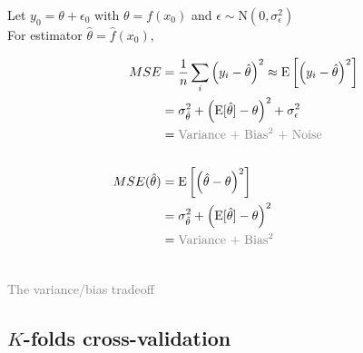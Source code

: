 \documentclass[11pt, oneside]{article}
\begin{document}
\noindent \begin{minipage}{0.55\linewidth} 
Let $y_0 = \theta + \epsilon_0$ with $\theta = f(x_0)$ and $\epsilon \sim \textrm{N}(0,\sigma^2_\epsilon)$\\

For estimator $\hat \theta = \hat f(x_0),$

\begin{align*}
MSE ={}&  \frac{1}{n}\sum_i \left(y_i - \hat \theta \right)^2 \approx 
\textrm{E}\left[\left(y_i - \hat \theta \right)^2\right] \\
={}&
\sigma^2_{\hat \theta} + \left(\textrm{E}{[}\hat \theta{]}-\theta\right)^2 + \sigma^2_\epsilon \\ 
={}& \textcolor{gray}{\textrm{Variance $+$ Bias$^2$ $+$ Noise}} \\ \\
MSE(\hat \theta) ={}& \textrm{E}\left[\left(\hat \theta - \theta\right)^2\right] \\
={}&
\sigma^2_{\hat \theta} + \left(\textrm{E}{[}\hat \theta{]}-\theta\right)^2 \\
={}& \textcolor{gray}{\textrm{Variance $+$ Bias$^2$}}
\end{align*}
\end{minipage}
\begin{minipage}{0.5\linewidth} 

\vspace{1.75em}
\\

\hspace{4em}\textcolor{gray}{The variance/bias tradeoff}
\end{minipage}

\subsection{ $K$-folds cross-validation}
\end{document}
